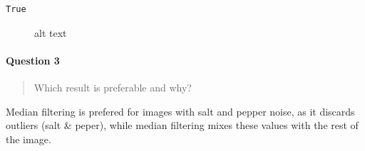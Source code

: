 \documentclass[11pt]{article}
\makeatletter
\newcommand{\boxspacing}{\kern\kvtcb@left@rule\kern\kvtcb@boxsep}
\newcommand{\prompt}[4]{
        {\ttfamily\llap{{\color{#2}[#3]:\hspace{3pt}#4}}\vspace{-\baselineskip}}
    }
\makeatother
\begin{document}
            \begin{tcolorbox}[breakable, size=fbox, boxrule=.5pt, pad at break*=1mm, opacityfill=0]
\prompt{Out}{outcolor}{13}{\boxspacing}
\begin{Verbatim}[commandchars=\\\{\}]
True
\end{Verbatim}
\end{tcolorbox}
        
    \begin{figure}
\centering
{}
\caption{alt text}
\end{figure}

    \paragraph{Question 3}\label{question-3}

\begin{quote}
Which result is preferable and why?
\end{quote}

Median filtering is prefered for images with salt and pepper noise, as
it discards outliers (salt \& peper), while median filtering mixes these
values with the rest of the image.
\end{document}
